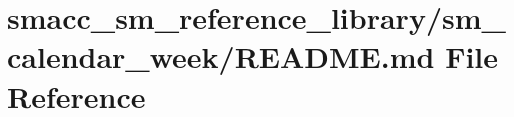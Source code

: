 \hypertarget{smacc__sm__reference__library_2sm__calendar__week_2README_8md}{}\section{smacc\+\_\+sm\+\_\+reference\+\_\+library/sm\+\_\+calendar\+\_\+week/\+R\+E\+A\+D\+ME.md File Reference}
\label{smacc__sm__reference__library_2sm__calendar__week_2README_8md}
